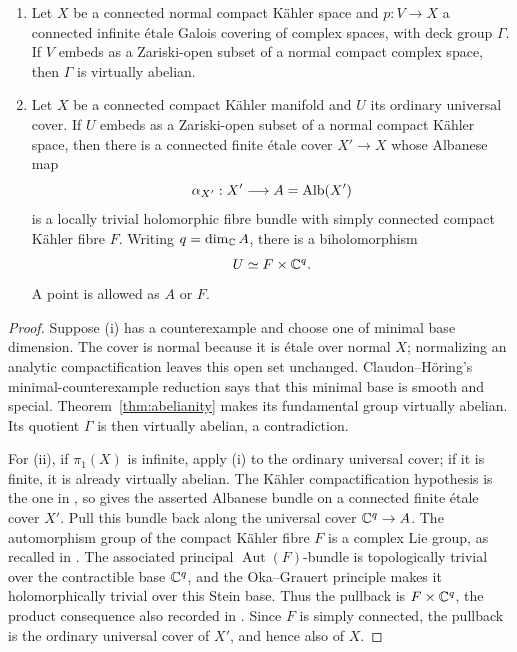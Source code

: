 \begin{corollary}
\label{cor:compactifiable-covers}
\begin{enumerate}[label=\textup{(\roman*)}]
\item Let \(X\) be a connected normal compact K\"ahler space and
\(p:V\to X\) a connected infinite \'etale Galois covering of complex
spaces, with deck group \(\Gamma\). If \(V\) embeds as a Zariski-open
subset of a normal compact complex space, then \(\Gamma\) is virtually
abelian.
\item Let \(X\) be a connected compact K\"ahler manifold and \(U\) its
ordinary universal cover. If \(U\) embeds as a Zariski-open subset of a
normal compact K\"ahler space, then there is a connected finite \'etale
cover \(X'\to X\) whose Albanese map
\[
 \alpha_{X'}:X'\longrightarrow A=\operatorname{Alb}(X')
\]
is a locally trivial holomorphic fibre bundle with simply connected
compact K\"ahler fibre \(F\). Writing \(q=\dim_{\mathbb C}A\), there is a
biholomorphism
\[
 U\simeq F\times\mathbb C^q.
\]
A point is allowed as \(A\) or \(F\).
\end{enumerate}
\end{corollary}

\begin{proof}
Suppose (i) has a counterexample and choose one of minimal base
dimension. The cover is normal because it is \'etale over normal
\(X\); normalizing an analytic compactification leaves this open set
unchanged. Claudon--H\"oring's minimal-counterexample reduction
\cite[Proposition~1.4]{ClaudonHoring2013} says that this minimal base is
smooth and special. Theorem~\ref{thm:abelianity} makes its fundamental
group virtually abelian. Its quotient \(\Gamma\) is then virtually
abelian, a contradiction.

For (ii), if \(\pi_1(X)\) is infinite, apply (i) to the ordinary
universal cover; if it is finite, it is already virtually abelian.
The K\"ahler compactification hypothesis is the one in
\cite[Definition~2.3]{ClaudonHoring2013}, so
\cite[Theorem~1.5]{ClaudonHoring2013} gives the asserted Albanese bundle
on a connected finite \'etale cover \(X'\). Pull this bundle back along
the universal cover \(\mathbb C^q\to A\). The automorphism group of the
compact K\"ahler fibre \(F\) is a complex Lie group, as recalled in
\cite[Section~2.C]{ClaudonHoring2013}. The associated principal
\(\operatorname{Aut}(F)\)-bundle is topologically trivial over the
contractible base \(\mathbb C^q\), and the Oka--Grauert principle makes it
holomorphically trivial over this Stein base. Thus the pullback is
\(F\times\mathbb C^q\), the product consequence also recorded in
\cite[Conjecture~1.1]{ClaudonHoring2013}. Since \(F\) is simply
connected, the pullback is the
ordinary universal cover of \(X'\), and hence also of \(X\).
\end{proof}

